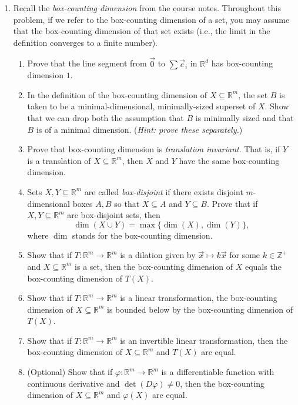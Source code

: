\documentclass[letter]{article}
\newcommand{\R}{\mathbb{R}}
\newcommand{\Z}{\mathbb{Z}}
\begin{document}
\begin{enumerate}
		\item Recall the \emph{box-counting dimension} from the course notes. Throughout this problem, if we
			refer to the box-counting dimension of a set, you may assume that the box-counting dimension of that
			set exists (i.e., the limit in the definition converges to a finite number).
			\begin{enumerate}
				\item Prove that the line segment from $\vec 0$ to $\sum \vec e_i$ in $\R^d$ has box-counting dimension $1$.
				\item In the definition of the box-counting dimension of $X\subseteq \R^m$, 
					the set $B$ is taken to be a minimal-dimensional, minimally-sized 
					superset of $X$. Show that we can drop both the
					assumption that $B$ is minimally sized and that $B$ is of a minimal dimension. (\emph{Hint: 
					prove these separately.})
				\item Prove that box-counting dimension is \emph{translation invariant}. That is, if $Y$ is
					a translation of $X\subseteq\R^m$, then $X$ and $Y$ have the same box-counting dimension.
				\item Sets $X,Y\subseteq \R^m$ are called \emph{box-disjoint} if there exists disjoint $m$-dimensional
					boxes $A,B$ so that $X\subseteq A$ and $Y\subseteq B$.
					Prove that if $X,Y\subseteq \R^m$ are box-disjoint sets, then 
					\[
						\dim(X\cup Y) = \max\{\dim(X),\dim(Y)\},
					\]
					where $\dim$ stands for the box-counting dimension.
				\item Show that
					if $T:\R^m\to\R^m$ is a dilation given by $\vec x\mapsto k\vec x$ for some $k\in\Z^+$ 
					and $X\subseteq \R^m$ is a set, then
					the box-counting dimension of $X$ equals the box-counting dimension of $T(X)$.
				\item Show that if $T:\R^m\to\R^m$ is a linear transformation, the box-counting dimension of
					$X\subseteq \R^m$ is bounded below by the box-counting dimension of $T(X)$.
				\item Show that if $T:\R^m\to\R^m$ is an invertible linear transformation, then the box-counting
					dimension of $X\subseteq\R^m$ and $T(X)$ are equal.
				\item (Optional) Show that if $\varphi:\R^m\to\R^m$ is a differentiable function
					with continuous derivative
					and $\det(D\varphi)\neq 0$, then the box-counting dimension of $X\subseteq \R^m$ and
					$\varphi(X)$ are equal.
			\end{enumerate}


	\end{enumerate}
\end{document}
